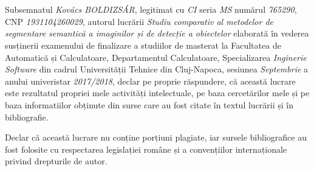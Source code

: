 \documentclass[12pt,a4paper,twoside,openright]{report}
\renewcommand{\thesisauthor}{Kovács BOLDIZSÁR}    %
\renewcommand{\thesismonth}{Septembrie}     %
\renewcommand{\thesistitle}{Studiu comparativ al metodelor de segmentare semantică a imaginilor și de detecție a obiectelor}
\begin{document}
\begin{titlepage}
\phantom{1}
\end{titlepage}



\begin{titlepage}

\begin{center}
\thispagestyle{firststylewithfooter}


{\scshape \facultynameromanian} \\
{\scshape \departmentnameromanian} \\
\end{center}

\vspace{3cm}

\begin{center}
\autheticitydeclarationsize \textbf{\autheticitydeclarationromanian}
\end{center}

\vspace{1cm}

Subsemnatul \textit{\thesisauthor}, legitimat cu \textit{CI} seria \textit{MS} numărul \textit{765290}, CNP \textit{1931104260029}, autorul lucrării \textit{\thesistitle} elaborată în vederea susținerii examenului de finalizare a studiilor de masterat la Facultatea de Automatică și Calculatoare, Departamentul Calculatoare, Specializarea \textit{Inginerie Software} din cadrul Universității Tehnice din Cluj-Napoca, sesiunea \textit{\thesismonth} a anului univeristar \textit{2017/2018}, declar pe proprie răspundere, că această lucrare este rezultatul propriei mele activități intelectuale, pe baza cercetărilor mele și pe baza informatiilor obținute din surse care au fost citate în textul lucrării și în bibliografie.

Declar că această lucrare nu conține porțiuni plagiate, iar sursele bibliografice au fost folosite cu respectarea legislației române și a convențiilor internaționale privind drepturile de autor.


\end{titlepage}
\end{document}
